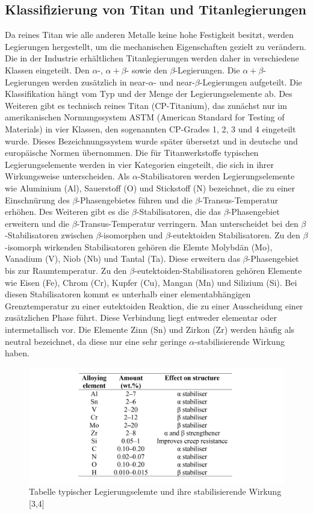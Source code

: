 \subsection{Klassifizierung von Titan und Titanlegierungen}

Da reines Titan wie alle anderen Metalle keine hohe Festigkeit besitzt, werden Legierungen hergestellt, um die mechanischen Eigenschaften gezielt zu verändern. Die in der Industrie erhältlichen Titanlegierungen werden daher in verschiedene Klassen eingeteilt. Den $\alpha$-, $\alpha+\beta$- sowie den $\beta$-Legierungen. Die $\alpha+\beta$-Legierungen werden zusätzlich in near-$\alpha$- und near-$\beta$-Legierungen aufgeteilt. Die Klassifikation hängt vom Typ und der Menge der Legierungselemente ab. Des Weiteren gibt es technisch reines Titan (CP-Titanium), das zunächst nur im amerikanischen Normungssystem ASTM (American Standard for Testing of Materials) in vier Klassen, den sogenannten CP-Grades 1, 2, 3 und 4 eingeteilt wurde. Dieses Bezeichnungssystem wurde später übersetzt und in deutsche und europäische Normen übernommen.
Die für Titanwerkstoffe typischen Legierungselemente werden in vier Kategorien eingeteilt, die sich in ihrer Wirkungsweise unterscheiden. 
Als $\alpha$-Stabilisatoren werden Legierungselemente wie Aluminium (Al), Sauerstoff (O) und Stickstoff (N) bezeichnet, die zu einer Einschnürung des $\beta$-Phasengebietes führen und die $\beta$-Transus-Temperatur erhöhen.
Des Weiteren gibt es die $\beta$-Stabilisatoren, die das $\beta$-Phasengebiet erweitern und die $\beta$-Transus-Temperatur verringern. Man unterscheidet bei den $\beta$-Stabilisatoren zwischen $\beta$-isomorphen und $\beta$-eutektoiden Stabilisatoren. Zu den $\beta$-isomorph wirkenden Stabilisatoren gehören die Elemte Molybdän (Mo), Vanadium (V), Niob (Nb) und Tantal (Ta). Diese erweitern das $\beta$-Phasengebiet bis zur Raumtemperatur. 
Zu den $\beta$-eutektoiden-Stabilisatoren gehören Elemente wie Eisen (Fe), Chrom (Cr), Kupfer (Cu), Mangan (Mn) und Silizium (Si). Bei diesen Stabilisatoren kommt es unterhalb einer elementabhängigen Grenztemperatur zu einer eutektoiden Reaktion, die zu einer Ausscheidung einer zusätzlichen Phase führt. Diese Verbindung liegt entweder elementar oder intermetallisch vor.
Die Elemente  Zinn (Sn) und Zirkon (Zr) werden häufig als neutral bezeichnet, da diese nur eine sehr geringe $\alpha$-stabilisierende Wirkung haben.
\cite{R.R.Boyer.1996}
\begin{figure}[h]
	\centering
	\includegraphics[width=1.0\linewidth]{"Bilder/Tabelle 1"}
	\caption[Tabelle 1]{Tabelle typischer Legierungselemte und ihre stabilisierende Wirkung [3,4]}
	\label{fig:tabelle-1}
\end{figure}


